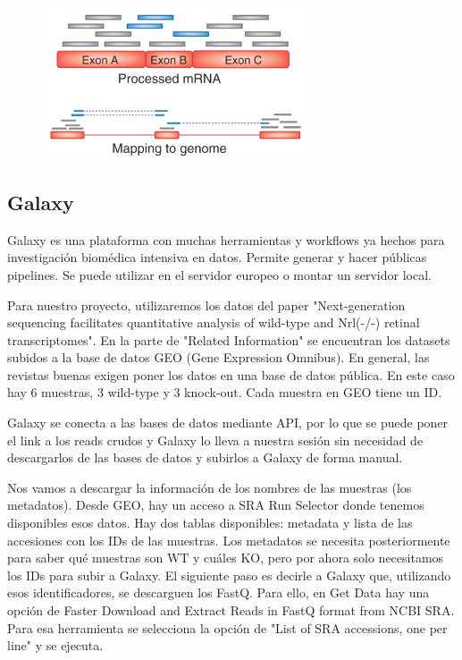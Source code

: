 \begin{figure}[h]
\centering
\includegraphics[width = 0.7\textwidth]{figs/Imagen1.png}
\end{figure}

\subsection{Galaxy}
Galaxy es una plataforma con muchas herramientas y workflows ya hechos para investigación biomédica intensiva en datos. Permite generar y hacer públicas pipelines. Se puede utilizar en el servidor europeo o montar un servidor local. 

Para nuestro proyecto, utilizaremos los datos del paper "Next-generation sequencing facilitates quantitative analysis of wild-type and Nrl(-/-) retinal transcriptomes". En la parte de "Related Information" se encuentran los datasets subidos a la base de datos GEO (Gene Expression Omnibus). En general, las revistas buenas exigen poner los datos en una base de datos pública. En este caso hay 6 muestras, 3 wild-type y 3 knock-out. Cada muestra en GEO tiene un ID. 

Galaxy se conecta a las bases de datos mediante API, por lo que se puede poner el link a los reads crudos y Galaxy lo lleva a nuestra sesión sin necesidad de descargarlos de las bases de datos y subirlos a Galaxy de forma manual. 

Nos vamos a descargar la información de los nombres de las muestras (los metadatos). Desde GEO, hay un acceso a SRA Run Selector donde tenemos disponibles esos datos. Hay dos tablas disponibles: metadata y lista de las accesiones con los IDs de las muestras. Los metadatos se necesita posteriormente para saber qué muestras son WT y cuáles KO, pero por ahora solo necesitamos los IDs para subir a Galaxy. El siguiente paso es decirle a Galaxy que, utilizando esos identificadores, se descarguen los FastQ. Para ello, en Get Data hay una opción de Faster Download and Extract Reads in FastQ format from NCBI SRA. Para esa herramienta se selecciona la opción de "List of SRA accessions, one per line" y se ejecuta.

